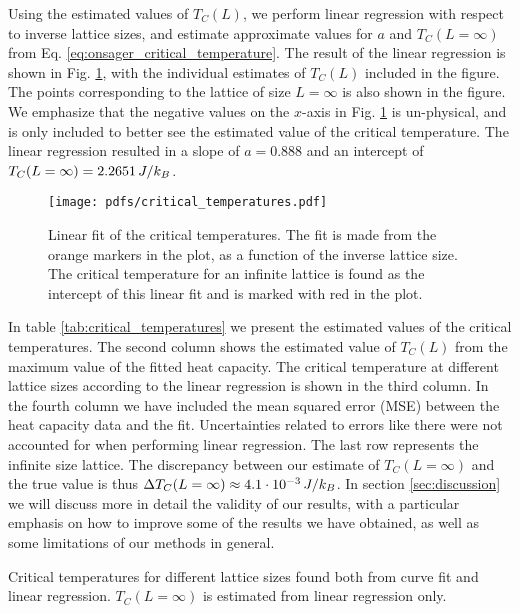 Using the estimated values of $T_C(L)$, we perform linear regression with respect to inverse lattice sizes, and estimate approximate values for $a$ and $T_C(L=\infty)$ from Eq. \eqref{eq:onsager_critical_temperature}. The result of the linear regression is shown in Fig. \ref{fig:critical_temperatures}, with the individual estimates of $T_C(L)$ included in the figure. The points corresponding to the lattice of size $L=\infty$ is also shown in the figure. We emphasize that the negative values on the $x$-axis in Fig. \ref{fig:critical_temperatures} is un-physical, and is only included to better see the estimated value of the critical temperature. The linear regression resulted in a slope of $a=0.888$ and an intercept of $T_C(L=\infty)=2.2651\,J/k_B$.     
\begin{figure}[!ht]
    \texttt{[image: pdfs/critical\_temperatures.pdf]} 
    \caption{Linear fit of the critical temperatures. The fit is made from the orange markers in the plot, as a function of the inverse lattice size. The critical temperature for an infinite lattice is found as the intercept of this linear fit and is marked with red in the plot. }
    \label{fig:critical_temperatures}
\end{figure} 

In table \ref{tab:critical_temperatures} we present the estimated values of the critical temperatures. The second column shows the estimated value of $T_C(L)$ from the maximum value of the fitted heat capacity. The critical temperature at different lattice sizes according to the linear regression is shown in the third column. In the fourth column we have included the mean squared error (MSE) between the heat capacity data and the fit. Uncertainties related to errors like there were not accounted for when performing linear regression. The last row represents the infinite size lattice. The discrepancy between our estimate of $T_C(L=\infty)$ and the true value is thus $\Delta T_C(L=\infty)\approx4.1\cdot10^{-3}\,J/k_B$. In section \ref{sec:discussion} we will discuss more in detail the validity of our results, with a particular emphasis on how to improve some of the results we have obtained, as well as some limitations of our methods in general.    
\begin{table}[!ht]
    
    \caption{Critical temperatures for different lattice sizes found both from curve fit and linear regression. $T_C(L=\infty)$ is estimated from linear regression only.}
    \label{tab:critical_temperatures}
\end{table}

